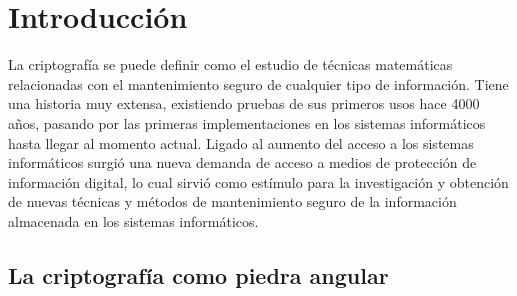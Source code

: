\documentclass[12pt,spanish,listoffigures,listoftables,listofalgorithms]{tfgetsinf}
\begin{document}

\mainmatter


\chapter{Introducci\'on}


La criptografía se puede definir como el estudio de técnicas matemáticas relacionadas con el mantenimiento seguro de cualquier tipo de información\cite{handbook}. Tiene una historia muy extensa, existiendo pruebas de sus primeros usos hace 4000 años, pasando por las primeras implementaciones en los sistemas informáticos hasta llegar al momento actual. Ligado al aumento del acceso a los sistemas informáticos surgió una nueva demanda de acceso a medios de protección de información digital, lo cual sirvió como estímulo para la investigación y obtención de nuevas técnicas y métodos de mantenimiento seguro de la información almacenada en los sistemas informáticos.

\section{La criptografía como piedra angular}


\end{document}
